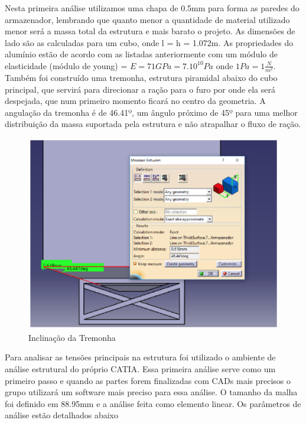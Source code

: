 Nesta primeira análise utilizamos uma chapa de 0.5mm para forma as paredes do armazenador, lembrando que quanto menor a quantidade de material utilizado menor será a massa total da estrutura e mais barato o projeto. As dimensões de lado são as calculadas para um cubo, onde l = h = 1.072m. As propriedades do alumínio estão de acordo com as listadas anteriormente com um módulo de elasticidade (módulo de young) = $E = 71GPa = 7.10^10Pa$ onde $1Pa = 1\frac{N}{m^2}$.
Também foi construído uma tremonha, estrutura piramidal abaixo do cubo principal, que servirá para direcionar a ração para o furo por onde ela será despejada, que num primeiro momento ficará no centro da geometria. A angulação da tremonha é de 46.41º, um ângulo próximo de 45º para uma melhor distribuição da massa suportada pela estrutura e não atrapalhar o fluxo de ração.

\begin{figure}[H]
 \centering
   \includegraphics[keepaspectratio=true,scale=0.8]{figuras/estrutura5.eps}
 \caption{Inclinação da Tremonha}
 \label{estrutura5}
\end{figure}

Para analisar as tensões principais na estrutura foi utilizado o ambiente de análise estrutural do próprio CATIA. Essa primeira análise serve como um primeiro passo e quando as partes forem finalizadas com CADs mais precisos o grupo utilizará um software mais preciso para essa análise. O tamanho da malha foi definido em 88.95mm e a análise feita como elemento linear. Os parâmetros de análise estão detalhados abaixo

